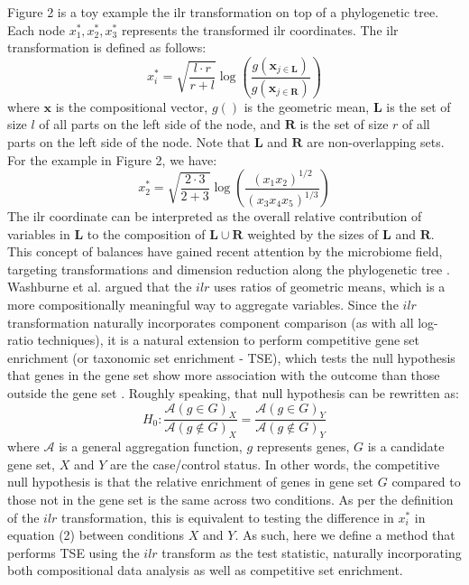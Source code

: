 \documentclass{article}
\begin{document}
Figure 2 is a toy example the ilr transformation on top of a phylogenetic tree. Each node $x_1^*, x_2^*, x_3^*$ represents the transformed ilr coordinates. The ilr transformation is defined as follows:
\begin{equation}
    x_i^* = \sqrt{\frac{l \cdot r}{r + l}} \log \left(\frac{g(\bm{x}_{j \in \bm{L}})}{g(\bm{x}_{j \in \bm{R}})}\right)
\end{equation}
where $\bm{x}$ is the compositional vector, $g()$ is the geometric mean, $\bm{L}$ is the set of size $l$ of all parts on the left side of the node, and $\bm R$ is the set of size $r$ of all parts on the left side of the node. Note that $\bm L$ and $\bm R$ are non-overlapping sets. For the example in Figure 2, we have: 
\[ x_2^* = \sqrt{\frac{2 \cdot 3}{2 + 3}} \log \left( \frac{(x_1x_2)^{1/2}}{(x_3x_4x_5)^{1/3}}\right) \]
The ilr coordinate can be interpreted as the overall relative contribution of variables in $\bm L$ to the composition of $\bm L \cup \bm R$ weighted by the sizes of $\bm L$ and $\bm R$. This concept of balances have gained recent attention by the microbiome field, targeting transformations and dimension reduction along the phylogenetic tree \cite{washburne2017a, silverman2017a}. Washburne et al. \cite{washburne2017a} argued that the $ilr$ uses ratios of geometric means, which is a more compositionally meaningful way to aggregate variables. Since the $ilr$ transformation naturally incorporates component comparison (as with all log-ratio techniques), it is a natural extension to perform competitive gene set enrichment (or taxonomic set enrichment - TSE), which tests the null hypothesis that genes in the gene set show more association with the outcome than those outside the gene set \cite{tian2005}. Roughly speaking, that null hypothesis can be rewritten as:
\begin{equation}
H_0 : \frac{\mathcal{A}(g \in G)_X}{\mathcal{A}(g \notin G)_X} = \frac{\mathcal{A}(g \in G)_Y}{\mathcal{A}(g \notin G)_Y}
\end{equation}
where $\mathcal{A}$ is a general aggregation function, $g$ represents genes, $G$ is a candidate gene set, $X$ and $Y$ are the case/control status. In other words, the competitive null hypothesis is that the relative enrichment of genes in gene set $G$ compared to those not in the gene set is the same across two conditions. As per the definition of the $ilr$ transformation, this is equivalent to testing the difference in $x^*_i$ in equation (2) between conditions $X$ and $Y$. As such, here we define a method that performs TSE using the $ilr$ transform as the test statistic, naturally incorporating both compositional data analysis as well as competitive set enrichment.     
\end{document}
